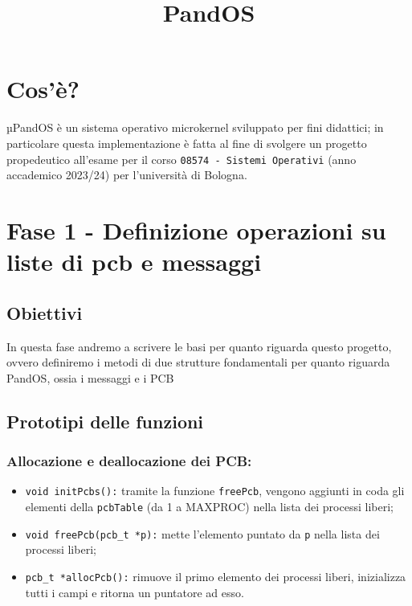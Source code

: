 \documentclass{article}
\title{\textmu PandOS}
\date{}
\begin{document}
	\maketitle

	\tableofcontents
	\newpage
	\section{Cos'è?}
	µPandOS è un sistema operativo microkernel sviluppato per fini didattici; in particolare
	questa implementazione è fatta al fine di svolgere un progetto propedeutico all'esame
	per il corso \texttt{08574 - Sistemi Operativi} (anno accademico 2023/24) per
	l'università di Bologna.\\

	\section{Fase 1 - Definizione operazioni su liste di pcb e messaggi}
	\subsection{Obiettivi}
	In questa fase andremo a scrivere le basi per quanto riguarda questo progetto,
	ovvero definiremo i metodi di due strutture fondamentali per quanto riguarda
	PandOS, ossia i messaggi e i PCB

	\subsection{Prototipi delle funzioni}
	\subsubsection{Allocazione e deallocazione dei PCB:}
	\begin{itemize}
		\item \texttt{void initPcbs():} tramite la funzione \texttt{freePcb},
			vengono aggiunti in coda gli elementi della \texttt{pcbTable} (da 1 a
			MAXPROC) nella lista dei processi liberi;

		\item \texttt{void freePcb(pcb\_t *p):} mette l'elemento puntato da \texttt{p}
			nella lista dei processi liberi;

		\item \texttt{pcb\_t *allocPcb():} rimuove il primo elemento dei processi
			liberi, inizializza tutti i campi e ritorna un puntatore ad esso.
	\end{itemize}
\end{document}
